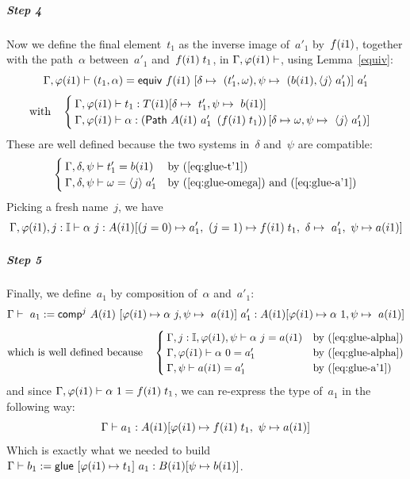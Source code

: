 \subparagraph*{Step 4} Now we define the final element~$t_1$ as the
inverse image of~$a'_1$ by~$f{}(i1)$, together with the
path~$\alpha$ between~$a'_1$ and~$f{}(i1) \; t_1$, in
$\Gamma,\varphi(i1)\vdash$, using Lemma~\ref{equiv}:
%
\[\Gamma,\varphi(i1)\vdash(t_1,\alpha) =
{\sf equiv}~f{}(i1)~[\delta\mapsto~(t'_1,\omega),\psi\mapsto~\left(b(i1),{\langle}j{\rangle} \;a'_1\right)]~a_1'\]
\[{\textrm{with}\quad}\begin{cases}
  \Gamma,\varphi(i1)\der t_1 :
  T(i1)[\delta\mapsto~t'_1,\psi\mapsto~b(i1)] %
  \\
  \Gamma,\varphi(i1)\der\alpha :
  \left(\Path~A(i1)~a'_1~\left(\myeq{}(i1) \; t_1\right)\right)
  [\delta\mapsto\omega,\psi\mapsto~\pabs{j} a'_1)]
\end{cases}
\]
These are well defined because the two systems in~$\delta$ and~$\psi$
are compatible:
\[\begin{cases}
  \Gamma, \delta, \psi \vdash t'_1 = b(i1) & \textrm{by~(\ref{eq:glue-t'1})} \\
  \Gamma, \delta, \psi \vdash \omega = {\langle}j{\rangle} \;a'_1 &
  \textrm{by~(\ref{eq:glue-omega}) and~(\ref{eq:glue-a'1})}
\end{cases}
\]
%
Picking a fresh name~$j$, we have
%
\begin{equation}
\Gamma,\varphi(i1),j:\mathbb{I}\vdash \alpha~j : A(i1)[(j=0)\mapsto
  a'_1,~(j=1)\mapsto f{}(i1) \; t_1,~\delta\mapsto~a'_1,~\psi\mapsto a(i1)]\label{eq:glue-alpha}
\end{equation}

\subparagraph*{Step 5} Finally, we define~$a_1$ by composition
of~$\alpha$ and~$a'_1$:
%
\[\Gamma\vdash~a_1:={\sf comp}^j~A(i1)~[\varphi(i1)\mapsto\alpha~j,\psi\mapsto~a(i1)]~a'_1:
A(i1)[\varphi(i1)\mapsto\alpha~1,\psi\mapsto~a(i1)]\]
\[\textrm{which is well defined because}\quad
\begin{cases}
  \Gamma,j:\mathbb{I},\varphi(i1),\psi \vdash \alpha~j = a(i1)
  &\textrm{by~(\ref{eq:glue-alpha})} \\
  \Gamma,\varphi(i1)\vdash \alpha~0 = a'_1
  &\textrm{by~(\ref{eq:glue-alpha})} \\
  \Gamma,\psi\vdash a(i1) = a'_1
  &\textrm{by~(\ref{eq:glue-a'1})}
\end{cases}
\]
and since $\Gamma,\varphi(i1)\vdash\alpha~1 = f{}(i1) \; t_1$, we can
re-express the type of~$a_1$ in the following way:
\[
  \Gamma\vdash a_1 : A(i1)[\varphi(i1)\mapsto f{}(i1) \;
  t_1,~\psi\mapsto a(i1)]
\]
Which is exactly what we needed to build
$\Gamma\vdash b_1 := {\sf glue} ~[\varphi(i1)\mapsto t_1]~a_1:
B(i1)[\psi\mapsto b(i1)]$.

